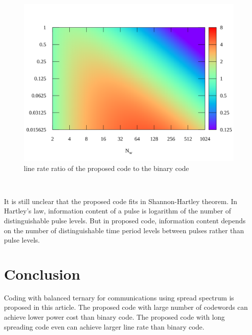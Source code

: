 \documentclass[dvipdfmx]{article}
\begin{document}
\begin{figure}[htbp]
  \begin{center}
    \includegraphics[clip, width=0.9\hsize, bb=0 0 800 600]{./resources/R.svg}
    \caption{line rate ratio of the proposed code to the binary code}
    \label{fig:rratio}
  \end{center}
\end{figure}
\, \newline

It is still unclear that the proposed code fits in Shannon-Hartley theorem.
In Hartley's law, information content of a pulse is
 logarithm of the number of distinguishable pulse levels.
But in proposed code, information content depends on
 the number of distinguishable time period levels between pulses rather than pulse levels.

 
\section{Conclusion}
Coding with balanced ternary for communications using spread spectrum is proposed in this article.
The proposed code with large number of codewords can achieve lower power cost than binary code.
The proposed code with long spreading code even can achieve larger line rate than binary code.
\end{document}
